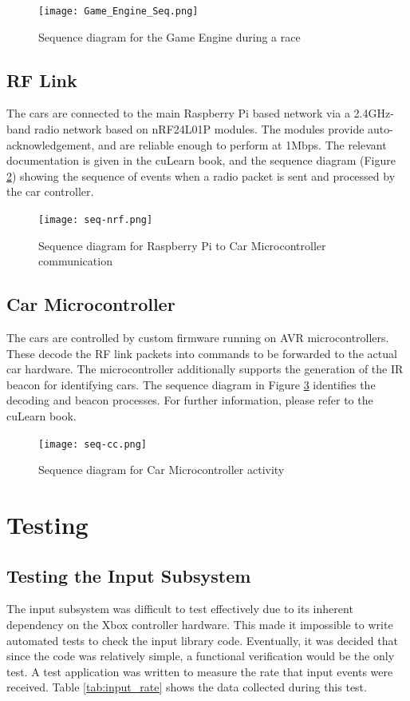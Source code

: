 \documentclass[letterpaper,fleqn]{article}
\begin{document}
\begin{figure}[H]
\centering
\texttt{[image: Game\_Engine\_Seq.png]}
\caption{Sequence diagram for the Game Engine during a race}
\label{fig:game}
\end{figure}

\subsection{RF Link}
The cars are connected to the main Raspberry Pi based network via a 2.4GHz-band radio network based on nRF24L01P modules. The modules provide auto-acknowledgement, and are reliable enough to perform at 1Mbps. The relevant documentation is given in the cuLearn book, and the sequence diagram (Figure \ref{fig:nrf}) showing the sequence of events when a radio packet is sent and processed by the car controller.

\begin{figure}[H]
\centering
\texttt{[image: seq-nrf.png]}
\caption{Sequence diagram for Raspberry Pi to Car Microcontroller communication}
\label{fig:nrf}
\end{figure}

\subsection{Car Microcontroller}
The cars are controlled by custom firmware running on AVR microcontrollers. These decode the RF link packets into commands to be forwarded to the actual car hardware. The microcontroller additionally supports the generation of the IR beacon for identifying cars. The sequence diagram in Figure \ref{fig:seq-car} identifies the decoding and beacon processes. For further information, please refer to the cuLearn book.

\begin{figure}[H]
\centering
\texttt{[image: seq-cc.png]}
\caption{Sequence diagram for Car Microcontroller activity}
\label{fig:seq-car}
\end{figure}
\section{Testing}
\subsection{Testing the Input Subsystem}
The input subsystem was difficult to test effectively due to its inherent dependency on the Xbox controller hardware. This made it impossible to write automated tests to check the input library code. Eventually, it was decided that since the code was relatively simple, a functional verification would be the only test. A test application was written to measure the rate that input events were received. Table \ref{tab:input_rate} shows the data collected during this test.
\end{document}
